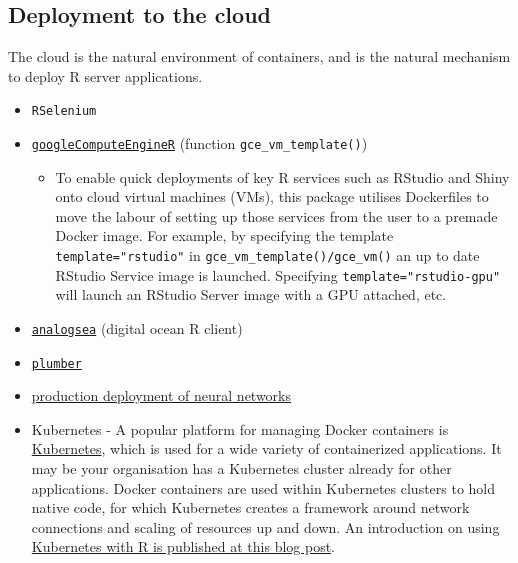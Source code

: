 \hypertarget{deployment-to-the-cloud}{%
\subsection{Deployment to the cloud}\label{deployment-to-the-cloud}}

\label{deployment}

The cloud is the natural environment of containers, and is the natural
mechanism to deploy R server applications.

\begin{itemize}
\tightlist
\item
  \texttt{RSelenium}
\item
  \href{https://cloudyr.github.io/googleComputeEngineR/}{\texttt{googleComputeEngineR}}
  (function \texttt{gce\_vm\_template()})

  \begin{itemize}
  \tightlist
  \item
    To enable quick deployments of key R services such as RStudio and
    Shiny onto cloud virtual machines (VMs), this package utilises
    Dockerfiles to move the labour of setting up those services from the
    user to a premade Docker image. For example, by specifying the
    template \texttt{template="rstudio"} in
    \texttt{gce\_vm\_template()/gce\_vm()} an up to date RStudio Service
    image is launched. Specifying \texttt{template="rstudio-gpu"} will
    launch an RStudio Server image with a GPU attached, etc.\\
  \end{itemize}
\item
  \href{https://github.com/sckott/analogsea}{\texttt{analogsea}}
  (digital ocean R client)
\item
  \href{https://www.rplumber.io/docs/hosting.html\#docker}{\texttt{plumber}}
\item
  \href{https://github.com/tmobile/r-tensorflow-api}{production
  deployment of neural networks} \citep[\citet{nolistic}]{jnolis}
\item
  Kubernetes - A popular platform for managing Docker containers is
  \href{https://kubernetes.io/}{Kubernetes}, which is used for a wide
  variety of containerized applications. It may be your organisation has
  a Kubernetes cluster already for other applications. Docker containers
  are used within Kubernetes clusters to hold native code, for which
  Kubernetes creates a framework around network connections and scaling
  of resources up and down. An introduction on using
  \href{https://code.markedmondson.me/r-on-kubernetes-serverless-shiny-r-apis-and-scheduled-scripts/}{Kubernetes
  with R is published at this blog post}.
\end{itemize}

